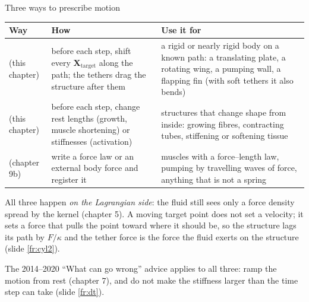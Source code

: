 \documentclass[aspectratio=169,11pt]{beamer}
\begin{document}
\begin{frame}{Three ways to prescribe motion}
\label{fr:ways}
\scriptsize
\begin{tabular}{@{}L{0.2\textwidth}L{0.36\textwidth}L{0.34\textwidth}@{}}
\toprule
Way & How & Use it for\\
\midrule
{} (this chapter) & before each step, shift every $\mathbf{X}_{\mathrm{target}}$ along the path; the tethers drag the structure after them & a rigid or nearly rigid body on a known path: a translating plate, a rotating wing, a pumping wall, a flapping fin (with soft tethers it also bends)\\
 (this chapter) & before each step, change rest lengths (growth, muscle shortening) or stiffnesses (activation) & structures that change shape from inside: growing fibres, contracting tubes, stiffening or softening tissue\\
 (chapter 9b) & write a force law or an external body force and register it & muscles with a force--length law, pumping by travelling waves of force, anything that is not a spring\\
\bottomrule
\end{tabular}

\vspace{2mm}
\small All three happen \emph{on the Lagrangian side}: the fluid still sees only a force density spread by the kernel (chapter 5). A moving target point does not set a velocity; it sets a force that pulls the point toward where it should be, so the structure lags its path by $F/\kappa$ and the tether force is the force the fluid exerts on the structure (slide \ref{fr:cyl2}).
\vspace{1mm}

\small The 2014--2020 ``What can go wrong'' advice applies to all three: ramp the motion from rest (chapter 7), and do not make the stiffness larger than the time step can take (slide \ref{fr:dt}).
\end{frame}
\end{document}
